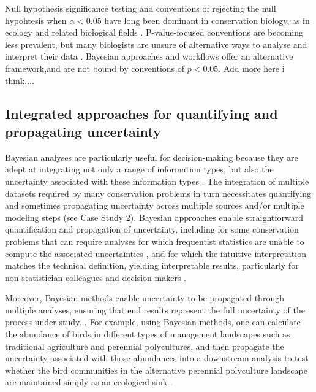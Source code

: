 \documentclass{article}
\begin{document}
\par Null hypothesis significance testing and conventions of rejecting the null hypohtesis when $\alpha <0.05$ have long been dominant in conservation biology, as in ecology and related biological fields \citep[e.g., ecotoxicaology][]{erickson2020moving}. P-value-focused conventions are becoming less prevalent, but many biologists are unsure of alternative ways to analyse and interpret their data \citep{halsey2019reign}. Bayesian approaches and workflows offer an alternative framework,and are not bound by conventions of $p<0.05$. Add more here i think....
\subsection*{Integrated approaches for quantifying and propagating uncertainty} 
\par Bayesian analyses are particularly useful for decision-making because they are adept at integrating not only a range of information types, but also the uncertainty associated with these information types \citep[e.g.,][]{stern2022interweaving}. The integration of multiple datasets required by many conservation problems in turn necessitates quantifying and sometimes propagating uncertainty across multiple sources and/or multiple modeling steps (see Case Study 2). Bayesian approaches enable straightforward quantification and  propagation of  uncertainty, including for some conservation problems that can require analyses for which frequentist statistics are unable to compute the associated uncertainties \citep{bolker2009a,bates2006r}, and for which the intuitive interpretation matches the technical definition, yielding interpretable results, particularly for non-statistician colleagues and decision-makers \citep{fornacon2021bayesian}. 
\par Moreover, Bayesian methods enable uncertainty to be propagated through multiple analyses, ensuring that end results represent the full uncertainty of the process under study. \citep{draper1995assessment,gilbert2023propagating,Eyster2022,Saunders2019}. For example, using Bayesian methods, one can calculate the abundance of birds in different types of management landscapes such as traditional agriculture and perennial polycultures, and then propagate the uncertainty associated with those abundances into a downstream analysis to test whether the bird communities in the alternative perennial polyculture landscape are maintained simply as an ecological sink \citep{Eyster2022}. 
\end{document}
